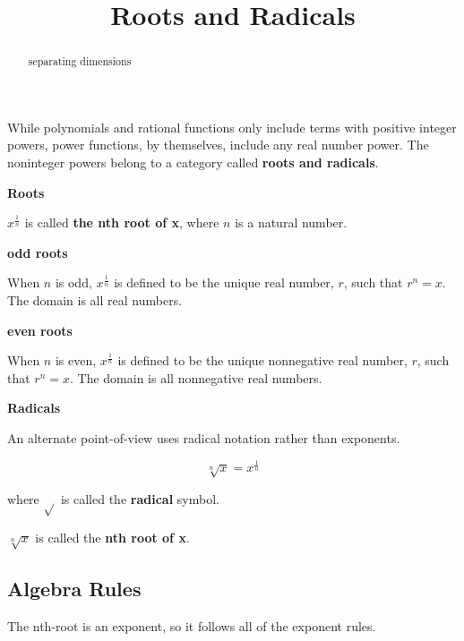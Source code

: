 \documentclass{ximera}
\title{Roots and Radicals}
\begin{document}
\begin{abstract}
separating dimensions
\end{abstract}
\maketitle


While polynomials and rational functions only include terms with positive integer powers, power functions, by themselves, include any real number power.  The noninteger powers belong to a category called \textbf{roots and radicals}.



\begin{definition} \textbf{\textcolor{green!50!black}{Roots}}

$x^{\tfrac{1}{n}}$ is called \textbf{the nth root of x}, where $n$ is a natural number.




\textbf{odd roots}

When $n$ is odd, $x^{\tfrac{1}{n}}$ is defined to be the unique real number, $r$, such that $r^n = x$. The domain is all real numbers.




\textbf{even roots}

When $n$ is even, $x^{\tfrac{1}{n}}$ is defined to be the unique nonnegative real number, $r$, such that $r^n = x$. The domain is all nonnegative real numbers.


\end{definition}



\begin{definition} \textbf{\textcolor{green!50!black}{Radicals}}

An alternate point-of-view uses radical notation rather than exponents.

\[   \sqrt[n]{x} =  x^{\tfrac{1}{n}}     \]

where $\sqrt{ }$ is called the \textbf{radical} symbol.


$\sqrt[n]{x}$ is called the \textbf{nth root of x}.

\end{definition}




\subsection{Algebra Rules}

The nth-root is an exponent, so it follows all of the exponent rules.
\end{document}
